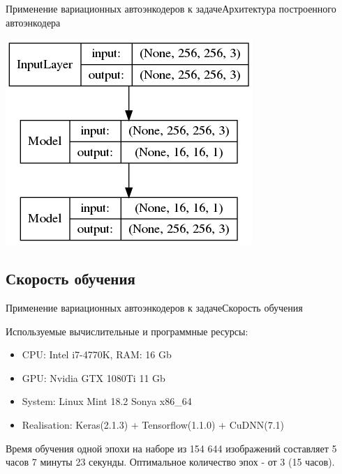 \documentclass{beamer}
\begin{document}
\begin{frame}{Применение вариационных автоэнкодеров к задаче}{Архитектура построенного автоэнкодера}
\begin{minipage}{0.1\textwidth}
\begin{center}
\end{center}
\end{minipage}
\hfill
\begin{minipage}{0.4\textwidth}
\begin{flushleft}
\includegraphics[scale=0.35]{autoencoder}
\end{flushleft}
\end{minipage}

\end{frame}

\subsection{Скорость обучения}

\begin{frame}{Применение вариационных автоэнкодеров к задаче}{Скорость обучения}

\begin{figure}[t]
\label{fig:vae}
\end{figure}

Используемые вычислительные и программные ресурсы:
\begin{itemize}
\item CPU: Intel i7-4770K, RAM: 16 Gb
\item GPU: Nvidia GTX 1080Ti 11 Gb
\item System: Linux Mint 18.2 Sonya x86\_64
\item Realisation: Keras(2.1.3) + Tensorflow(1.1.0) + CuDNN(7.1)
\end{itemize}

Время обучения одной эпохи на наборе из 154 644 изображений составляет 5 часов 7 минуты 23 секунды.
Оптимальное количество эпох - от 3 (15 часов).

\end{frame}
\end{document}
